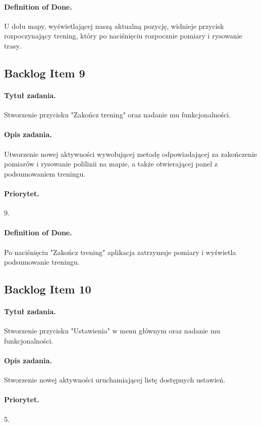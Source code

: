 \documentclass[a4paper]{article}
\begin{document}
\paragraph{Definition of Done.} U dołu mapy, wyświetlającej naszą aktualną pozycję, widnieje przycisk rozpoczynający trening, który po naciśnięciu rozpocznie pomiary i rysowanie trasy.

\subsection{Backlog Item 9}
\paragraph{Tytuł zadania.} Stworzenie przycisku "Zakończ trening" oraz nadanie mu funkcjonalności.
\paragraph{Opis zadania.} Utworzenie nowej aktywności wywołującej metodę odpowiadającej za zakończenie pomiarów i rysowanie polilinii na mapie, a także otwierającej panel z podsumowaniem treningu. 
\paragraph{Priorytet.} 9.
\paragraph{Definition of Done.} Po naciśnięciu "Zakończ trening" aplikacja zatrzymuje pomiary i wyświetla podsumowanie treningu.

\subsection{Backlog Item 10}
\paragraph{Tytuł zadania.} Stworzenie przycisku "Ustawienia" w menu głównym oraz nadanie mu funkcjonalności.
\paragraph{Opis zadania.} Stworzenie nowej aktywności uruchamiającej listę dostępnych ustawień. 
\paragraph{Priorytet.} 5.
\end{document}
